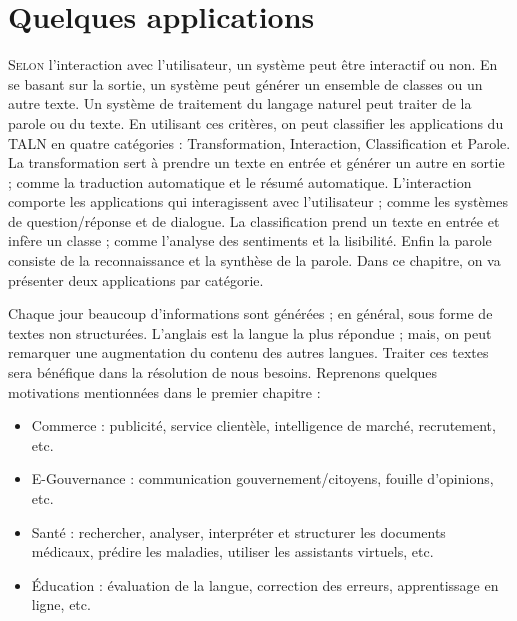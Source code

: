 \documentclass{KodeBook}
\begin{document}
		\mainmatter
	
\fi
\chapter{Quelques applications}

\begin{introduction}
	\lettrine{S}{elon} l'interaction avec l'utilisateur, un système peut être interactif ou non.
	En se basant sur la sortie, un système peut générer un ensemble de classes ou un autre texte. 
	Un système de traitement du langage naturel peut traiter de la parole ou du texte. 
	En utilisant ces critères, on peut classifier les applications du TALN en quatre catégories : Transformation, Interaction, Classification et Parole. 
	La transformation sert à prendre un texte en entrée et générer un autre en sortie ; comme la traduction automatique et le résumé automatique. 
	L'interaction comporte les applications qui interagissent avec l'utilisateur ; comme les systèmes de question/réponse et de dialogue.
	La classification prend un texte en entrée et infère un classe ; comme l'analyse des sentiments et la lisibilité.
	Enfin la parole consiste de la reconnaissance et la synthèse de la parole.
	Dans ce chapitre, on va présenter deux applications par catégorie.
\end{introduction} 

Chaque jour beaucoup d'informations sont générées ; en général, sous forme de textes non structurées. 
L'anglais est la langue la plus répondue ; mais, on peut remarquer une augmentation du contenu des autres langues.
Traiter ces textes sera bénéfique dans la résolution de nous besoins.
Reprenons quelques motivations mentionnées dans le premier chapitre :
\begin{itemize}
	\item Commerce : publicité, service clientèle, intelligence de marché, recrutement, etc.
	\item E-Gouvernance : communication gouvernement/citoyens, fouille d'opinions, etc.
	\item Santé : rechercher, analyser, interpréter et structurer les documents médicaux, prédire les maladies, utiliser les assistants virtuels, etc.
	\item Éducation :  évaluation de la langue, correction des erreurs, apprentissage en ligne, etc.
\end{itemize}
\end{document}
